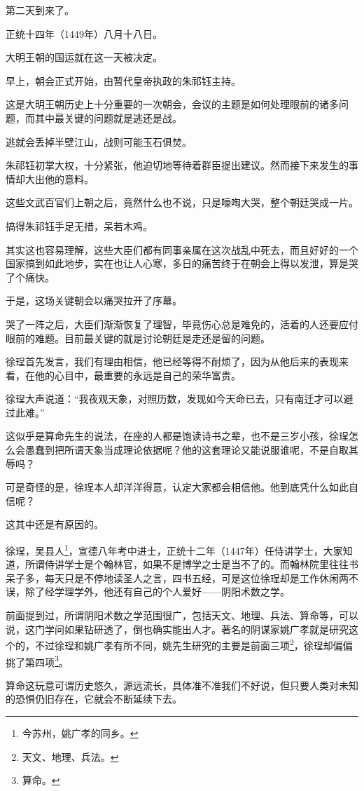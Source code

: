 \begin{multicols}{\theparacolNo}
第二天到来了。

正统十四年（1449年）八月十八日。

大明王朝的国运就在这一天被决定。

早上，朝会正式开始，由暂代皇帝执政的朱祁钰主持。

这是大明王朝历史上十分重要的一次朝会，会议的主题是如何处理眼前的诸多问题，而其中最关键的问题就是逃还是战。

逃就会丢掉半壁江山，战则可能玉石俱焚。

朱祁钰初掌大权，十分紧张，他迫切地等待着群臣提出建议。然而接下来发生的事情却大出他的意料。

这些文武百官们上朝之后，竟然什么也不说，只是嚎啕大哭，整个朝廷哭成一片。

搞得朱祁钰手足无措，呆若木鸡。

其实这也容易理解，这些大臣们都有同事亲属在这次战乱中死去，而且好好的一个国家搞到如此地步，实在也让人心寒，多日的痛苦终于在朝会上得以发泄，算是哭了个痛快。

于是，这场关键朝会以痛哭拉开了序幕。

哭了一阵之后，大臣们渐渐恢复了理智，毕竟伤心总是难免的，活着的人还要应付眼前的难题。目前最关键的就是讨论朝廷是走还是留的问题。

徐珵首先发言，我们有理由相信，他已经等得不耐烦了，因为从他后来的表现来看，在他的心目中，最重要的永远是自己的荣华富贵。

徐珵大声说道：“我夜观天象，对照历数，发现如今天命已去，只有南迁才可以避过此难。”

这似乎是算命先生的说法，在座的人都是饱读诗书之辈，也不是三岁小孩，徐珵怎么会愚蠢到把所谓天象当成理论依据呢？他的这套理论又能说服谁呢，不是自取其辱吗？

可是奇怪的是，徐珵本人却洋洋得意，认定大家都会相信他。他到底凭什么如此自信呢？

这其中还是有原因的。

徐珵，吴县人\footnote{今苏州，姚广孝的同乡。}，宣德八年考中进士，正统十二年（1447年）任侍讲学士，大家知道，所谓侍讲学士是个翰林官，如果不是博学之士是当不了的。而翰林院里往往书呆子多，每天只是不停地读圣人之言，四书五经，可是这位徐珵却是工作休闲两不误，除了经学理学外，他还有自己的个人爱好——阴阳术数之学。

前面提到过，所谓阴阳术数之学范围很广，包括天文、地理、兵法、算命等，可以说，这门学问如果钻研透了，倒也确实能出人才。著名的阴谋家姚广孝就是研究这个的，不过徐珵和姚广孝有所不同，姚先生研究的主要是前面三项\footnote{天文、地理、兵法。}，徐珵却偏偏挑了第四项\footnote{算命。}。

算命这玩意可谓历史悠久，源远流长，具体准不准我们不好说，但只要人类对未知的恐惧仍旧存在，它就会不断延续下去。


\end{multicols}
